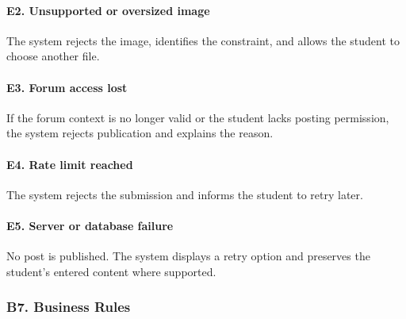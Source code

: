 \documentclass[12pt]{article}
\begin{document}
\hypertarget{sec:e2-unsupported-or-oversized-image}{}
\paragraph*{E2. Unsupported or oversized image}
\par\medskip

The system rejects the image, identifies the constraint, and allows the student to choose another file.
\par\medskip

\hypertarget{sec:e3-forum-access-lost}{}
\paragraph*{E3. Forum access lost}
\par\medskip

If the forum context is no longer valid or the student lacks posting permission, the system rejects publication and explains the reason.
\par\medskip

\hypertarget{sec:e4-rate-limit-reached}{}
\paragraph*{E4. Rate limit reached}
\par\medskip

The system rejects the submission and informs the student to retry later.
\par\medskip

\hypertarget{sec:e5-server-or-database-failure}{}
\paragraph*{E5. Server or database failure}
\par\medskip

No post is published. The system displays a retry option and preserves the student's entered content where supported.
\par\medskip

\hypertarget{sec:b7-business-rules}{}
\subsubsection*{B7. Business Rules}
\par\medskip
\end{document}
